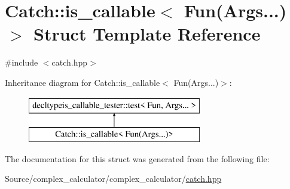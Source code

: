 \hypertarget{struct_catch_1_1is__callable_3_01_fun_07_args_8_8_8_08_4}{}\section{Catch\+:\+:is\+\_\+callable$<$ Fun(Args...)$>$ Struct Template Reference}
\label{struct_catch_1_1is__callable_3_01_fun_07_args_8_8_8_08_4}


{\ttfamily \#include $<$catch.\+hpp$>$}

Inheritance diagram for Catch\+:\+:is\+\_\+callable$<$ Fun(Args...)$>$\+:\begin{figure}[H]
\begin{center}
\leavevmode
\includegraphics[height=2.000000cm]{struct_catch_1_1is__callable_3_01_fun_07_args_8_8_8_08_4}
\end{center}
\end{figure}


The documentation for this struct was generated from the following file\+:\begin{DoxyCompactItemize}
\item 
Source/complex\+\_\+calculator/complex\+\_\+calculator/\mbox{\hyperlink{catch_8hpp}{catch.\+hpp}}\end{DoxyCompactItemize}

